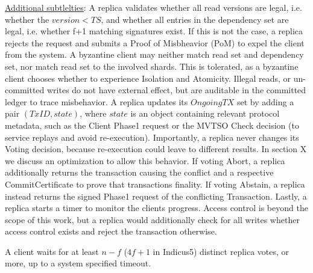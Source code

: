 \underline{Additional subtlelties}: A replica validates whether all read versions are legal, i.e. whether the $version < TS$, and whether all entries in the dependency set are legal, i.e. whether f+1 matching signatures exist. If this is not the case, a replica rejects the request and submits a Proof of Misbheavior (PoM) to expel the client from the system. A byzantine client may neither match read set and dependency set, nor match read set to the involved shards. This is tolerated, as a byzantine client chooses whether to experience Isolation and Atomicity. Illegal reads, or un-committed writes do not have external effect, but are auditable in the committed ledger to trace misbehavior. 
A replica updates its $OngoingTX$ set by adding a pair $(TxID, state)$, where $state$ is an object containing relevant protocol metadata, such as the Client Phase1 request or the MVTSO Check decision (to service replays and avoid re-execution). Importantly, a replica never changes its Voting decision, because re-execution could leave to different results. In section X we discuss an optimization to allow this behavior. If voting Abort, a replica additionally returns the transaction causing the conflict and a respective CommitCertificate to prove that transactions finality. If voting Abstain, a replica instead returns the signed Phase1 request of the conflicting Transaction.  
Lastly, a replica starts a timer to monitor the clients progress.
Access control is beyond the scope of this work, but a replica would additionally check for all writes whether access control exists and reject the transaction otherwise.


A client waits for at least $n-f$ ($4f+1$ in Indicus5) distinct replica votes, or more, up to a system specified timeout. 

